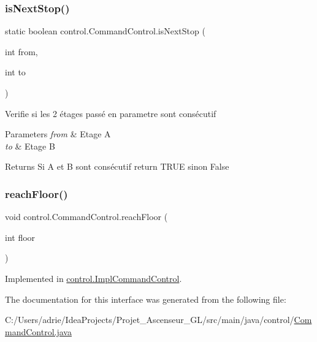 \mbox{\label{interfacecontrol_1_1_command_control_a4b2de21fece2328d079558688927fad2}} 
\subsubsection{\texorpdfstring{isNextStop()}{isNextStop()}}
{\footnotesize\ttfamily static boolean control.\+Command\+Control.\+is\+Next\+Stop (\begin{DoxyParamCaption}\item[{int}]{from,  }\item[{int}]{to }\end{DoxyParamCaption})\hspace{0.3cm}{\ttfamily [static]}}

Verifie si les 2 étages passé en parametre sont consécutif 
\begin{DoxyParams}{Parameters}
{\em from} & Etage A \\
\hline
{\em to} & Etage B \\
\hline
\end{DoxyParams}
\begin{DoxyReturn}{Returns}
Si A et B sont consécutif return T\+R\+UE sinon False 
\end{DoxyReturn}
\mbox{\label{interfacecontrol_1_1_command_control_aed88af210353f0e854d6da8af1089851}} 
\subsubsection{\texorpdfstring{reachFloor()}{reachFloor()}}
{\footnotesize\ttfamily void control.\+Command\+Control.\+reach\+Floor (\begin{DoxyParamCaption}\item[{int}]{floor }\end{DoxyParamCaption})}



Implemented in \mbox{\hyperlink{classcontrol_1_1_impl_command_control_a5736ac91cdc39805dc27c6af0c9935cb}{control.\+Impl\+Command\+Control}}.



The documentation for this interface was generated from the following file\+:\begin{DoxyCompactItemize}
\item 
C\+:/\+Users/adrie/\+Idea\+Projects/\+Projet\+\_\+\+Ascenseur\+\_\+\+G\+L/src/main/java/control/\mbox{\hyperlink{_command_control_8java}{Command\+Control.\+java}}\end{DoxyCompactItemize}
